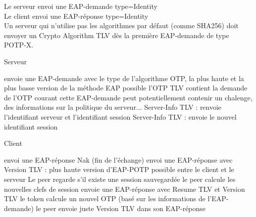 \documentclass{../res/univ-projet}
\begin{document}
Le serveur envoi une EAP-demande type=Identity\\
Le client envoi une EAP-réponse type=Identity\\

Un serveur qui n'utilise pas les algorithmes par défaut (comme SHA256) doit envoyer un Crypto Algorithm TLV dès la première EAP-demande de type POTP-X.\\

\begin{flushleft}
\begin{algorithm}[!h]
	\caption{Serveur}
	\label{POTP:verif}
\begin{algorithmic}
\STATE envoie une EAP-demande avec le type de l'algorithme OTP, la plus haute et la plus basse version de la méthode EAP possible
\STATE l'OTP TLV contient la demande de l'OTP courant
\STATE cette EAP-demande peut potentiellement contenir un chalenge, des informations sur la politique du serveur...
	\STATE Server-Info TLV : renvoie l'identifiant serveur et l'identifiant session
\ELSE
	\STATE Server-Info TLV : envoie le nouvel identifiant session
\ENDIF

\end{algorithmic}
\end{algorithm}
\end{flushleft}


\begin{flushright}
\begin{algorithm}[!h]
	\caption{Client}
	\label{POTP:verif}
\begin{algorithmic}
	\STATE envoi une EAP-réponse Nak (fin de l'échange)
\ELSE
	\STATE envoi une EAP-réponse avec Version TLV : plus haute version d'EAP-POTP possible entre le client et le serveur
		\STATE Le peer regarde s'il existe une session sauvegardée
				\STATE le peer calcule les nouvelles clefs de session
			\ENDIF
			\STATE envoie une EAP-réponse avec Resume TLV et Version TLV
		\ENDIF
		\STATE le token calcule un nouvel OTP (basé sur les informations de l'EAP-demande)
		\STATE le peer envoie juste Version TLV dans son EAP-réponse
	\ENDIF
\ENDIF

\end{algorithmic}
\end{algorithm}
\end{flushright}
\end{document}
